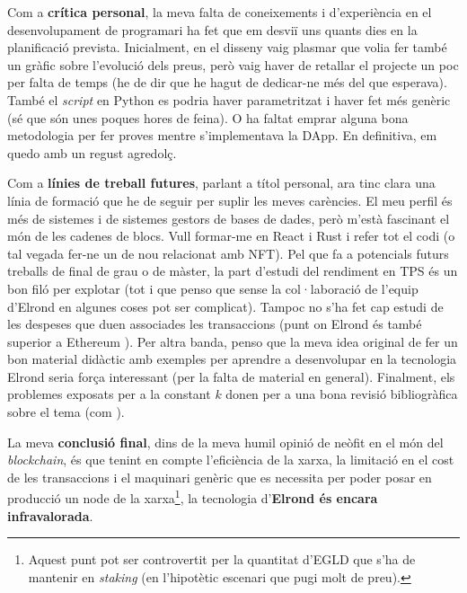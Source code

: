 \documentclass[11pt,a4paper]{article}
\begin{document}
Com a \textbf{crítica personal}, la meva falta de coneixements i d'experiència en el desenvolupament de programari ha fet que em desviï uns quants dies en la planificació prevista. Inicialment, en el disseny vaig plasmar que volia fer també un gràfic sobre l'evolució dels preus, però vaig haver de retallar el projecte un poc per falta de temps (he de dir que he hagut de dedicar-ne més del que esperava). També el \textit{script} en Python es podria haver parametritzat i haver fet més genèric (sé que són unes poques hores de feina). O ha faltat emprar alguna bona metodologia per fer proves mentre s'implementava la DApp. En definitiva, em quedo amb un regust agredolç.

Com a \textbf{línies de treball futures}, parlant a títol personal, ara tinc clara una línia de formació que he de seguir per suplir les meves carències. El meu perfil és més de sistemes i de sistemes gestors de bases de dades, però m'està fascinant el món de les cadenes de blocs. Vull formar-me en React i Rust i refer tot el codi (o tal vegada fer-ne un de nou relacionat amb NFT). Pel que fa a potencials futurs treballs de final de grau o de màster, la part d'estudi del rendiment en TPS és un bon filó per explotar (tot i que penso que sense la col·laboració de l'equip d'Elrond en algunes coses pot ser complicat). Tampoc no s'ha fet cap estudi de les despeses que duen associades les transaccions (punt on Elrond és també superior a Ethereum \cite{paradigm2019,everstake2020}). Per altra banda, penso que la meva idea original de fer un bon material didàctic amb exemples per aprendre a desenvolupar en la tecnologia Elrond seria força interessant (per la falta de material en general). Finalment, els problemes exposats per a la constant \(k\) donen per a una bona revisió bibliogràfica sobre el tema (com \cite{zhang2018}).

La meva \textbf{conclusió final}, dins de la meva humil opinió de neòfit en el món del \textit{blockchain}, és que tenint en compte l'eficiència de la xarxa, la limitació en el cost de les transaccions i el maquinari genèric que es necessita per poder posar en producció un node de la xarxa\footnote{Aquest punt pot ser controvertit per la quantitat d'EGLD que s'ha de mantenir en \textit{staking} (en l'hipotètic escenari que pugi molt de preu).}, la tecnologia d'\textbf{Elrond és encara infravalorada}.

\newpage 
\end{document}

